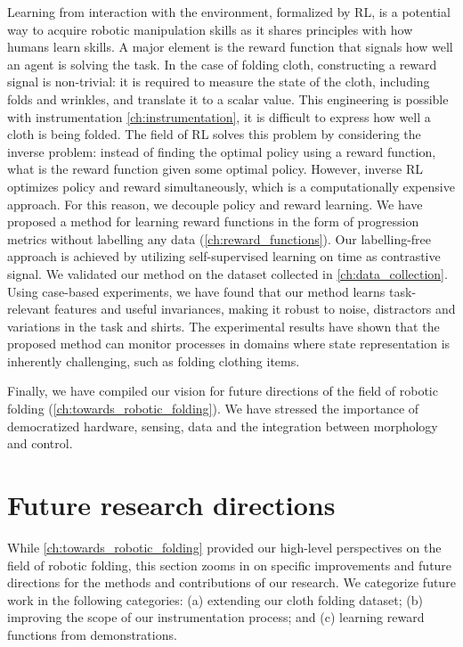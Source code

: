 \documentclass[\home/main.tex]{subfiles}
\begin{document}
Learning from interaction with the environment, formalized by RL, is a potential way to acquire robotic manipulation skills as it shares principles with how humans learn skills. A major element is the reward function that signals how well an agent is solving the task. In the case of folding cloth, constructing a reward signal is non-trivial: it is required to measure the state of the cloth, including folds and wrinkles, and translate it to a scalar value. This engineering is possible with instrumentation \cref{ch:instrumentation}, it is difficult to express how well a cloth is being folded. The field of RL solves this problem by considering the inverse problem: instead of finding the optimal policy using a reward function, what is the reward function given some optimal policy. However, inverse RL optimizes policy and reward simultaneously, which is a computationally expensive approach. For this reason, we decouple policy and reward learning. We have proposed a method for learning reward functions in the form of progression metrics without labelling any data (\cref{ch:reward_functions}). Our labelling-free approach is achieved by utilizing self-supervised learning on time as contrastive signal. We validated our method on the dataset collected in \cref{ch:data_collection}. Using case-based experiments, we have found that our method learns task-relevant features and useful invariances, making it robust to noise, distractors and variations in the task and shirts. The experimental results have shown that the proposed method can monitor processes in domains where state representation is inherently challenging, such as folding clothing items.

Finally, we have compiled our vision for future directions of the field of robotic folding (\cref{ch:towards_robotic_folding}). We have stressed the importance of democratized hardware, sensing, data and the integration between morphology and control.

\section{Future research directions} \label{sec:conc_future_work}
While \cref{ch:towards_robotic_folding} provided our high-level perspectives on the field of robotic folding,
this section zooms in on specific improvements and future directions for the methods and contributions of our research. We categorize future work in the following categories:
(a) extending our cloth folding dataset;
(b) improving the scope of our instrumentation process; and
(c) learning reward functions from demonstrations.
\end{document}
